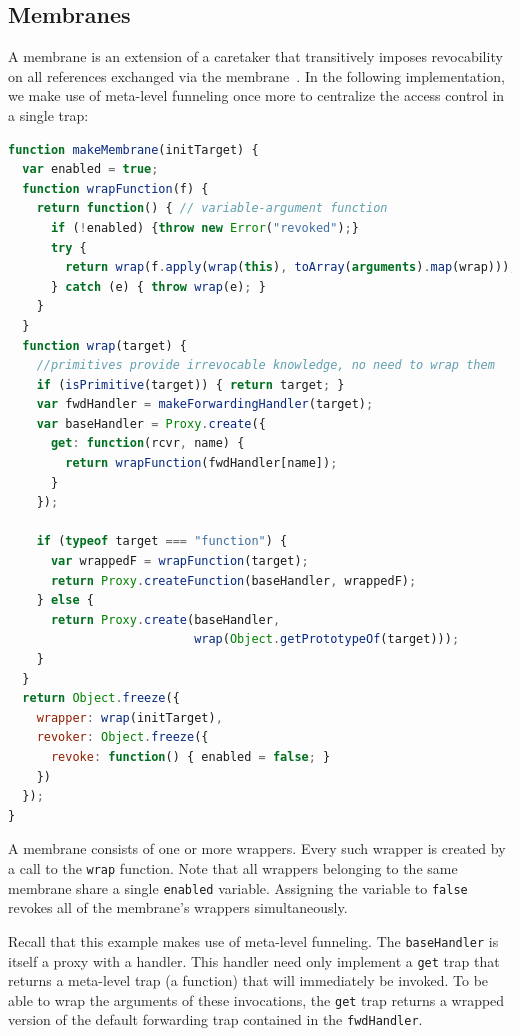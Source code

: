 \documentclass{sig-alternate}
\begin{document}
\subsection{Membranes}
\label{sub:membranes}

A membrane is an extension of a caretaker that transitively imposes revocability on all references exchanged via the membrane~\cite{miller06robust}. In the following implementation, we make use of meta-level funneling once more to centralize the access control in a single trap:

\begin{lstlisting}[language=javascript]
function makeMembrane(initTarget) {
  var enabled = true;
  function wrapFunction(f) {
    return function() { // variable-argument function
      if (!enabled) {throw new Error("revoked");}
      try {
        return wrap(f.apply(wrap(this), toArray(arguments).map(wrap)));
      } catch (e) { throw wrap(e); } 
    }
  }
  function wrap(target) {
    //primitives provide irrevocable knowledge, no need to wrap them
    if (isPrimitive(target)) { return target; }
    var fwdHandler = makeForwardingHandler(target);
    var baseHandler = Proxy.create({
      get: function(rcvr, name) {
        return wrapFunction(fwdHandler[name]);
      }
    });
    
    if (typeof target === "function") {
      var wrappedF = wrapFunction(target);
      return Proxy.createFunction(baseHandler, wrappedF);
    } else {
      return Proxy.create(baseHandler,
                          wrap(Object.getPrototypeOf(target)));
    }
  }
  return Object.freeze({
    wrapper: wrap(initTarget),
    revoker: Object.freeze({
      revoke: function() { enabled = false; }
    })
  });
}
\end{lstlisting}

A membrane consists of one or more wrappers. Every such wrapper is created by a call to the \texttt{wrap} function. Note that all wrappers belonging to the same membrane share a single \texttt{enabled} variable. Assigning the variable to \texttt{false} revokes all of the membrane's wrappers simultaneously.

Recall that this example makes use of meta-level funneling. The \texttt{baseHandler} is itself a proxy with a handler. This handler need only implement a \texttt{get} trap that returns a meta-level trap (a function) that will immediately be invoked. To be able to wrap the arguments of these invocations, the \texttt{get} trap returns a wrapped version of the default forwarding trap contained in the \texttt{fwdHandler}.
\end{document}
